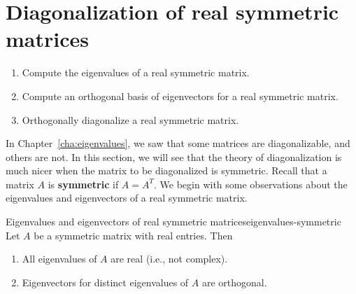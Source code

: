 \section{Diagonalization of real symmetric matrices}

\begin{outcome}
  \begin{enumerate}
  \item Compute the eigenvalues of a real symmetric matrix.
  \item Compute an orthogonal basis of eigenvectors for a real symmetric
    matrix.
  \item Orthogonally diagonalize a real symmetric matrix. 
  \end{enumerate}
\end{outcome}

In Chapter~\ref{cha:eigenvalues}, we saw that some matrices are
diagonalizable, and others are not. In this section, we will see that
the theory of diagonalization is much nicer when the matrix to be
diagonalized is symmetric. Recall that a matrix $A$ is
\textbf{symmetric}%
%
 if $A=A^T$. We begin with some observations
about the eigenvalues and eigenvectors of a real symmetric matrix.

\begin{proposition}{Eigenvalues and eigenvectors of real symmetric matrices}{eigenvalues-symmetric}
  Let $A$ be a symmetric matrix with real entries. Then
  \begin{enumialphparenastyle}
    \begin{enumerate}
    \item All eigenvalues of $A$ are real (i.e., not complex).
    \item Eigenvectors for distinct eigenvalues of $A$ are orthogonal.
    \end{enumerate}
  \end{enumialphparenastyle}
\end{proposition}


